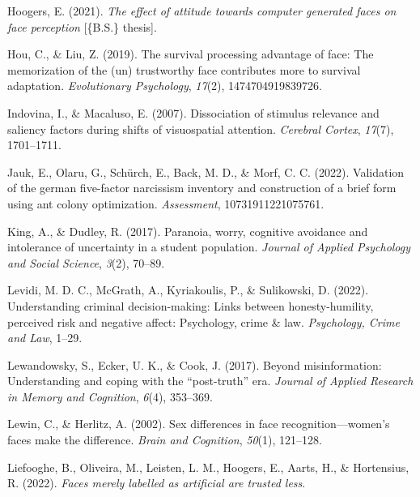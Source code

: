 \documentclass[
  man,mask,floatsintext]{apa6}
\newlength{\cslhangindent}
\newlength{\cslentryspacingunit} %
\newenvironment{CSLReferences}[2] %
 {%
  \setlength{\parindent}{0pt}
  \ifodd #1
  \let\oldpar\par
  \def\par{\hangindent=\cslhangindent\oldpar}
  \fi
  \setlength{\parskip}{#2\cslentryspacingunit}
 }%
 {}
\begin{document}
\begin{CSLReferences}{1}{0}
\leavevmode{}%
Hoogers, E. (2021). \emph{The effect of attitude towards computer generated faces on face perception} {[}\{B.S.\} thesis{]}.

\leavevmode{}%
Hou, C., \& Liu, Z. (2019). The survival processing advantage of face: The memorization of the (un) trustworthy face contributes more to survival adaptation. \emph{Evolutionary Psychology}, \emph{17}(2), 1474704919839726.

\leavevmode{}%
Indovina, I., \& Macaluso, E. (2007). Dissociation of stimulus relevance and saliency factors during shifts of visuospatial attention. \emph{Cerebral Cortex}, \emph{17}(7), 1701--1711.

\leavevmode{}%
Jauk, E., Olaru, G., Schürch, E., Back, M. D., \& Morf, C. C. (2022). Validation of the german five-factor narcissism inventory and construction of a brief form using ant colony optimization. \emph{Assessment}, 10731911221075761.

\leavevmode{}%
King, A., \& Dudley, R. (2017). Paranoia, worry, cognitive avoidance and intolerance of uncertainty in a student population. \emph{Journal of Applied Psychology and Social Science}, \emph{3}(2), 70--89.

\leavevmode{}%
Levidi, M. D. C., McGrath, A., Kyriakoulis, P., \& Sulikowski, D. (2022). Understanding criminal decision-making: Links between honesty-humility, perceived risk and negative affect: Psychology, crime \& law. \emph{Psychology, Crime and Law}, 1--29.

\leavevmode{}%
Lewandowsky, S., Ecker, U. K., \& Cook, J. (2017). Beyond misinformation: Understanding and coping with the {``post-truth''} era. \emph{Journal of Applied Research in Memory and Cognition}, \emph{6}(4), 353--369.

\leavevmode{}%
Lewin, C., \& Herlitz, A. (2002). Sex differences in face recognition---women's faces make the difference. \emph{Brain and Cognition}, \emph{50}(1), 121--128.

\leavevmode{}%
Liefooghe, B., Oliveira, M., Leisten, L. M., Hoogers, E., Aarts, H., \& Hortensius, R. (2022). \emph{Faces merely labelled as artificial are trusted less}.


\end{CSLReferences}
\end{document}

